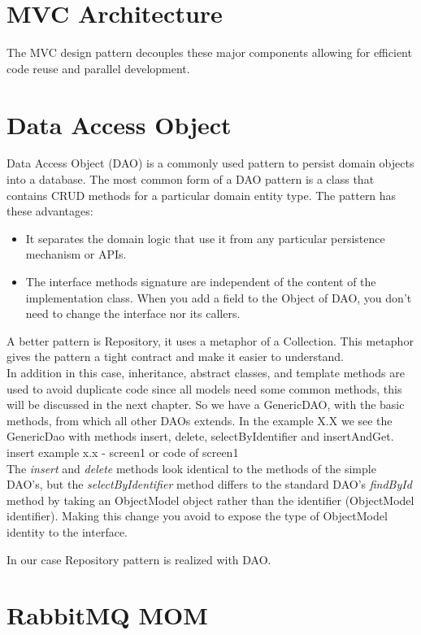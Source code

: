 \documentclass[a4paper,12pt]{report}
\begin{document}
\section{MVC Architecture}
The MVC design pattern decouples these major components allowing for efficient code reuse and parallel development.
\section{Data Access Object}
Data Access Object (DAO) is a commonly used pattern to persist domain objects into a database. The most common form of a DAO pattern is a class that contains CRUD methods for a particular domain entity type.
The pattern has these advantages:
\begin{itemize}
\item It separates the domain logic that use it from any particular persistence mechanism or APIs.
\item The interface methods signature are independent of the content of the implementation class. When you add a field to the Object of DAO, you don’t need to change the interface nor its callers.
\end{itemize}

A better pattern is Repository, it uses a metaphor of a Collection. This metaphor gives the pattern a tight contract and make it easier to understand.\\
In addition in this case, inheritance, abstract classes, and template methods are used to avoid duplicate code since all models need some common methods, this will be discussed in the next chapter.
So we have a GenericDAO, with the basic methods, from which all other DAOs extends.
In the example X.X we see the GenericDao with methods insert, delete, selectByIdentifier and insertAndGet.
\\{insert example x.x - screen1 or code of screen1}\\
The \textit{insert} and \textit{delete} methods look identical to the methods of the simple DAO's, but the \textit{selectByIdentifier} method differs to the standard DAO’s \textit{findById} method by taking an ObjectModel object rather than the identifier (ObjectModel identifier). 
Making this change you avoid to expose the type of ObjectModel identity to the interface.

In our case Repository pattern is realized with DAO.
\section{RabbitMQ MOM}
\end{document}
